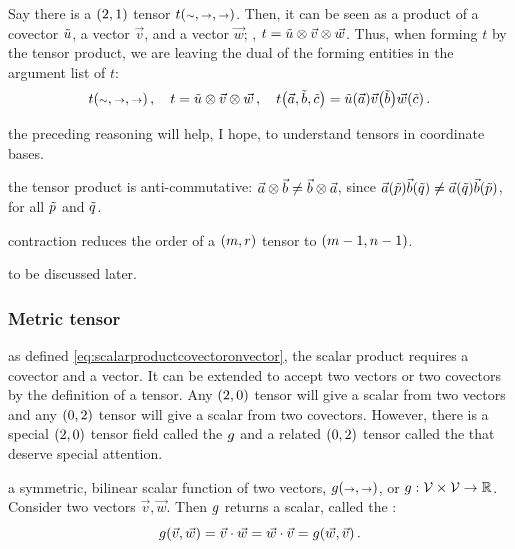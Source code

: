  Say there is a $\torder 21$ tensor $t\vat{\cslot,\vslot,\vslot}$. Then, it can be seen as a product of a covector $\tilde{u}$, a vector $\vec v$, and a vector $\vec w$; \ie, $t = \tilde{u}\otimes\vec v\otimes\vec w$. Thus, when forming $t$ by the tensor product, we are leaving the dual of the forming entities in the argument list of $t$:
%
\begin{equation*}
  t\vat{\cslot,\vslot,\vslot}         \,,\quad 
  t = \cov u\tprod\vec v\tprod\vec w  \,,\quad
  t\vat{\vec a,\cov b,\cov c} = \cov u\vat{\vec a}\vec v\vat{\cov b}\vec w\vat{\cov c}\,.
\end{equation*}

 the preceding reasoning will help, I hope, to understand tensors in coordinate bases.

 the tensor product is anti-commutative: $\vec a\otimes\vec b \neq \vec b\otimes\vec a$, since $\vec a\vat{\cov p}\vec b\vat{\cov q}\neq\vec a\vat{\cov q}\vec b\vat{\cov p}$, for all $\tilde{p}$ and $\tilde{q}$.

 contraction reduces the order of a $\torder mr$ tensor to $\torder{m - 1}{n - 1}$.

 to be discussed later.


\subsubsection{Metric tensor}
%
 as defined \cref{eq:scalarproductcovectoronvector}, the scalar product requires a covector and a vector. It can be extended to accept two vectors or two covectors by the definition of a tensor. Any $\torder 20$ tensor will give a scalar from two vectors and any $\torder 02$ tensor will give a scalar from two covectors. However, there is a special $\torder 20$ tensor field called the  $g$ and a related $\torder 02$ tensor called the  that deserve special attention.

 a symmetric, bilinear scalar function of two vectors, $\metric\vat{\vslot,\vslot}$, or ${g}:{\mathcal{V}\times\mathcal{V}}\to{\mathbb{R}}$. Consider two vectors $\vec v,\vec w$. Then $g$ returns a scalar, called the :
%
\begin{equation}\label{eq:metricdotproduct}
  \metric\vat{\vec v, \vec w} = \vec v\iprod\vec w 
                              = \vec w\iprod\vec v 
                              = \metric\vat{\vec w,\vec v}\,.
\end{equation}

